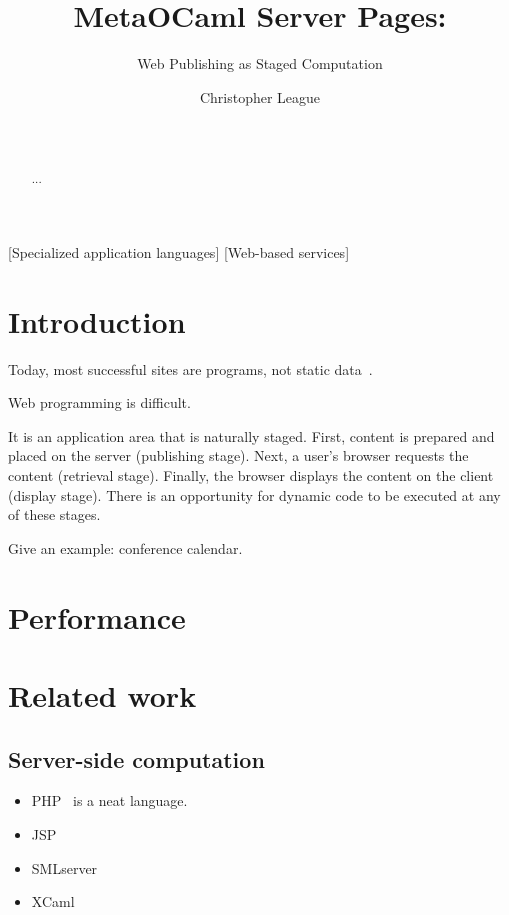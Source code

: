 \documentclass{acm_proc_article-sp}
\begin{document}
\title{MetaOCaml Server Pages:}
\subtitle{Web Publishing as Staged Computation}
\author{
  \alignauthor Christopher League\\
  \\
  \\
  }
\maketitle
\begin{abstract}
...
\end{abstract}
[Specialized application languages]
[Web-based services]
\section{Introduction}

Today, most successful sites are programs, not static
data~\cite{greenspun99panda}.

Web programming is difficult.

It is an application area that is naturally staged.  First, content is
prepared and placed on the server (publishing stage).  Next, a user's
browser requests the content (retrieval stage).  Finally, the browser
displays the content on the client (display stage).  There is an
opportunity for dynamic code to be executed at any of these stages.

Give an example: conference calendar.  

\section{Performance}

\section{Related work}

\subsection{Server-side computation}
\label{sec:related-server}

\begin{itemize}
\item PHP~\cite{bakken04php} is a neat language.
\item JSP~\cite{mahmoud03jsp}
\item SMLserver~\cite{elsman02smlserver,elsman03web}
\item XCaml~\cite{baretta04xcaml}
\end{itemize}
\end{document}
